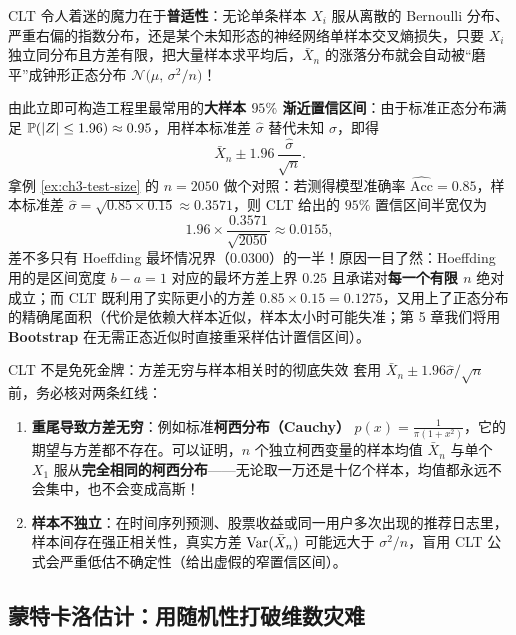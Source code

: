 CLT 令人着迷的魔力在于\textbf{普适性}：无论单条样本 $X_i$ 服从离散的 Bernoulli 分布、严重右偏的指数分布，还是某个未知形态的神经网络单样本交叉熵损失，只要 $X_i$ 独立同分布且方差有限，把大量样本求平均后，$\bar{X}_n$ 的涨落分布就会自动被“磨平”成钟形正态分布 $\mathcal{N}\bigl(\mu,\, \sigma^2/n\bigr)$！

由此立即可构造工程里最常用的\textbf{大样本 $95\%$ 渐近置信区间}：由于标准正态分布满足 $\mathbb{P}(|Z| \le 1.96) \approx 0.95$，用样本标准差 $\hat{\sigma}$ 替代未知 $\sigma$，即得
\begin{equation}
  \bar{X}_n \pm 1.96\,\frac{\hat{\sigma}}{\sqrt{n}}. \label{eq:ch3-clt-ci}
\end{equation}
拿例 \ref{ex:ch3-test-size} 的 $n = 2050$ 做个对照：若测得模型准确率 $\widehat{\mathrm{Acc}} = 0.85$，样本标准差 $\hat{\sigma} = \sqrt{0.85 \times 0.15} \approx 0.3571$，则 CLT 给出的 $95\%$ 置信区间半宽仅为
\[
  1.96 \times \frac{0.3571}{\sqrt{2050}} \approx 0.0155,
\]
差不多只有 Hoeffding 最坏情况界（$0.0300$）的一半！原因一目了然：Hoeffding 用的是区间宽度 $b-a=1$ 对应的最坏方差上界 $0.25$ 且承诺对\textbf{每一个有限 $n$} 绝对成立；而 CLT 既利用了实际更小的方差 $0.85\times 0.15 = 0.1275$，又用上了正态分布的精确尾面积（代价是依赖大样本近似，样本太小时可能失准；第 5 章我们将用 \textbf{Bootstrap} 在无需正态近似时直接重采样估计置信区间）。

\begin{failBox}{CLT 不是免死金牌：方差无穷与样本相关时的彻底失效}
套用 $\bar{X}_n \pm 1.96\hat{\sigma}/\sqrt{n}$ 前，务必核对两条红线：
\begin{enumerate}
  \item \textbf{重尾导致方差无穷}：例如标准\textbf{柯西分布（Cauchy）} $p(x) = \frac{1}{\pi(1+x^2)}$，它的期望与方差都不存在。可以证明，$n$ 个独立柯西变量的样本均值 $\bar{X}_n$ 与单个 $X_1$ 服从\textbf{完全相同的柯西分布}——无论取一万还是十亿个样本，均值都永远不会集中，也不会变成高斯！
  \item \textbf{样本不独立}：在时间序列预测、股票收益或同一用户多次出现的推荐日志里，样本间存在强正相关性，真实方差 $\operatorname{Var}(\bar{X}_n)$ 可能远大于 $\sigma^2/n$，盲用 CLT 公式会严重低估不确定性（给出虚假的窄置信区间）。
\end{enumerate}
\end{failBox}

\subsection{蒙特卡洛估计：用随机性打破维数灾难}


